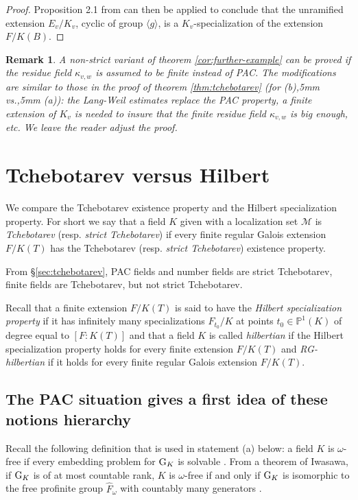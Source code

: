 \documentclass[12pt,english]{amsart}
\newtheorem{twisting lemma}[theorem]{Twisting lemma}
\newtheorem{remark}[theorem]{Remark}
\begin{document}
\begin{proof}
Proposition 2.1 from \cite{DEGha} can then be applied to conclude that the unramified extension $E_v/K_v$, cyclic of group $\langle g\rangle$, is a $K_v$-specia\-li\-za\-tion of the extension $F/K(B)$. 
\end{proof} 

\begin{remark}
A non-strict variant of theorem \ref{cor:further-example} can be proved if the residue field $\kappa_{v,w}$ is assumed to be {finite} instead of PAC. 
The modifications are similar to those in the proof of  theorem \ref{thm:tchebotarev} (for (b),5mm {\it vs.},5mm (a)): the Lang-Weil estimates replace the PAC property, a finite extension of $K_v$ is needed to insure that the finite residue field $\kappa_{v,w}$ is big enough, etc.  We leave the reader adjust the proof.
\end{remark}

\section{Tchebotarev versus Hilbert}  \label{ssec:tchebotarev-hilbert}
 We compare the Tchebotarev existence property and the Hilbert specialization property. For short we say that a field $K$ given with a localization set ${\mathcal M}$ is {\it Tchebotarev} (resp. {\it strict Tchebotarev}) if every finite regular Galois extension $F/K(T)$ has the Tchebotarev (resp. {\it strict Tchebotarev}) existence property.

From \S \ref{sec:tchebotarev}, PAC fields and number fields are strict Tchebotarev, finite fields are Tchebotarev, but not strict Tchebotarev.

Recall that a finite extension $F/K(T)$ is said to have the {\it Hilbert specialization property} if it has infinitely many specializations $F_{t_0}/K$ at points $t_0\in {\mathbb{P}}^1(K)$ of degree equal to $[F:K(T)]$ and that a field
$K$ is called {\it hilbertian} if the Hilbert specialization property holds for every 
finite extension $F/K(T)$ and {\it RG-hilbertian} if it holds for every finite regular Galois extension $F/K(T)$.

\subsection{The PAC situation {\rm gives a first idea of these notions hierarchy}}
Recall the following definition that is used in statement (a) below: a field $K$ is $\omega$-free if every embedding problem for ${\hbox{\rm G}}_K$ is solvable \cite[\S 27.1]{FrJa}. From a theorem of Iwasawa, if ${\hbox{\rm G}}_K$ is of at most countable rank, $K$ is $\omega$-free if and only if  ${\hbox{\rm G}}_K$ is isomorphic to the free profinite group $\hat F_\omega$ with countably many generators \cite[theorem 24.8.1]{FrJa}.
\end{document}
